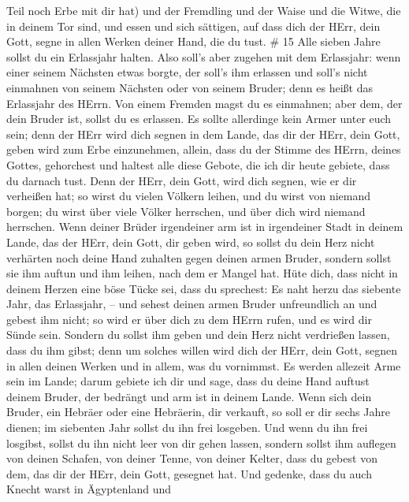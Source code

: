 Teil noch Erbe mit dir hat) und der Fremdling und der Waise und die
Witwe, die in deinem Tor sind, und essen und sich sättigen, auf dass
dich der HErr, dein Gott, segne in allen Werken deiner Hand, die du
tust. \# 15  Alle sieben Jahre sollst du ein Erlassjahr
halten.  Also soll's aber zugehen mit dem Erlassjahr: wenn
einer seinem Nächsten etwas borgte, der soll's ihm erlassen und soll's
nicht einmahnen von seinem Nächsten oder von seinem Bruder; denn es
heißt das Erlassjahr des HErrn.  Von einem Fremden magst du
es einmahnen; aber dem, der dein Bruder ist, sollst du es erlassen.
 Es sollte allerdinge kein Armer unter euch sein; denn der
HErr wird dich segnen in dem Lande, das dir der HErr, dein Gott, geben
wird zum Erbe einzunehmen,  allein, dass du der Stimme des
HErrn, deines Gottes, gehorchest und haltest alle diese Gebote, die ich
dir heute gebiete, dass du darnach tust.  Denn der HErr,
dein Gott, wird dich segnen, wie er dir verheißen hat; so wirst du
vielen Völkern leihen, und du wirst von niemand borgen; du wirst über
viele Völker herrschen, und über dich wird niemand herrschen.
 Wenn deiner Brüder irgendeiner arm ist in irgendeiner Stadt
in deinem Lande, das der HErr, dein Gott, dir geben wird, so sollst du
dein Herz nicht verhärten noch deine Hand zuhalten gegen deinen armen
Bruder,  sondern sollst sie ihm auftun und ihm leihen, nach
dem er Mangel hat.  Hüte dich, dass nicht in deinem Herzen
eine böse Tücke sei, dass du sprechest: Es naht herzu das siebente Jahr,
das Erlassjahr, -- und sehest deinen armen Bruder unfreundlich an und
gebest ihm nicht; so wird er über dich zu dem HErrn rufen, und es wird
dir Sünde sein.  Sondern du sollst ihm geben und dein Herz
nicht verdrießen lassen, dass du ihm gibst; denn um solches willen wird
dich der HErr, dein Gott, segnen in allen deinen Werken und in allem,
was du vornimmst.  Es werden allezeit Arme sein im Lande;
darum gebiete ich dir und sage, dass du deine Hand auftust deinem
Bruder, der bedrängt und arm ist in deinem Lande.  Wenn
sich dein Bruder, ein Hebräer oder eine Hebräerin, dir verkauft, so soll
er dir sechs Jahre dienen; im siebenten Jahr sollst du ihn frei
losgeben.  Und wenn du ihn frei losgibst, sollst du ihn
nicht leer von dir gehen lassen,  sondern sollst ihm
auflegen von deinen Schafen, von deiner Tenne, von deiner Kelter, dass
du gebest von dem, das dir der HErr, dein Gott, gesegnet hat.
 Und gedenke, dass du auch Knecht warst in Ägyptenland und
